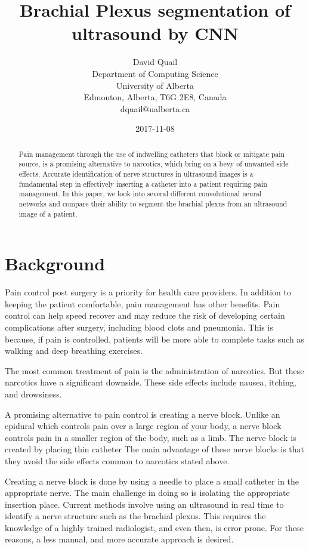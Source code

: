 \documentclass[letterpaper]{article}
\title{Brachial Plexus segmentation of ultrasound by CNN}
\date{2017-11-08}
\author{David Quail\\
Department of Computing Science \\ University of Alberta \\
Edmonton, Alberta, T6G 2E8, Canada \\
dquail@ualberta.ca}
\begin{document}
\maketitle
\begin{abstract}
Pain management through the use of indwelling catheters that block or mitigate pain source, is a promising alternative to narcotics, which bring on a bevy of unwanted side effects. Accurate identification of nerve structures in ultrasound images is a fundamental step in effectively inserting a catheter into a patient requiring pain management. In this paper, we look into several different convolutional neural networks and compare their ability to segment the brachial plexus from an ultrasound image of a patient. 
\end{abstract}
    
\section{Background}

Pain control post surgery is a priority for health care providers. In addition to keeping the patient comfortable, pain management has other benefits. Pain control can help speed recover and may reduce the risk of developing certain complications after surgery, including blood clots and pneumonia. This is because, if pain is controlled, patients will be more able to complete tasks such as walking and deep breathing exercises.

The most common treatment of pain is the administration of narcotics. But these narcotics have a significant downside. These side effects include nausea, itching, and drowsiness. 

A promising alternative to pain control is creating a nerve block. Unlike an epidural which controls pain over a large region of your body, a nerve block controls pain in a smaller region of the body, such as a limb. The nerve block is created by placing thin catheter The main advantage of these nerve blocks is that they avoid the side effects common to narcotics stated above.

Creating a nerve block is done by using a needle to place a small catheter in the appropriate nerve. The main challenge in doing so is isolating the appropriate insertion place. Current methods involve using an ultrasound in real time to identify a nerve structure such as the brachial plexus. This requires the knowledge of a highly trained radiologist, and even then, is error prone. For these reasons, a less manual, and more accurate approach is desired. 
\end{document}
